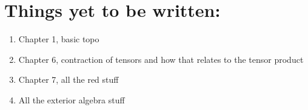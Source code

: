 \chapter*{Things yet to be written:}
\begin{enumerate}
  \item{Chapter 1, basic topo}
  \item{Chapter 6, contraction of tensors and how that relates to the tensor
  product}
  \item{Chapter 7, all the red stuff}
  \item{All the exterior algebra stuff}
\end{enumerate}